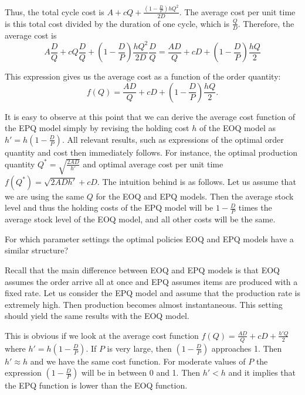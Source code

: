 \begin{solution}
Thus, the total cycle cost is $A+cQ+\frac{(1-\frac{D}{P}) h Q^2}{2D}$. The average cost per unit time is this total cost divided by the duration of one cycle, which is $\frac{Q}{D}$. Therefore, the average cost is
\begin{equation*}
A \frac{D}{Q}+cQ \frac{D}{Q} + \left(1-\frac{D}{P}\right) \frac{h Q^2}{2D} \frac{D}{Q} = \frac{AD}{Q}+cD+\left(1-\frac{D}{P}\right)\frac{hQ}{2}
\end{equation*}

This expression gives us the average cost as a function of the order quantity:
\begin{equation*}
f(Q) = \frac{AD}{Q}+cD+\left(1-\frac{D}{P}\right)\frac{hQ}{2}.
\end{equation*}

It is easy to observe at this point that we can derive the average cost function of the EPQ model simply by revising the holding cost $h$ of the EOQ model as $h'=h \left(1-\frac{D}{P}\right)$. All relevant results, such as expressions of the optimal order quantity and cost then immediately follows. For instance, the optimal production quantity $Q^*=\sqrt{\frac{2AD}{h'}}$ and optimal average cost per unit time $f(Q^*)=\sqrt{2ADh'}+cD$. The intuition behind is as follows. Let us assume that we are using the same $Q$ for the EOQ and EPQ models. Then the average stock level and thus the holding costs of the EPQ model will be $1-\frac{D}{P}$ times the average stock level of the EOQ model, and all other costs will be the same.  
\end{solution}

\begin{question}
For which parameter settings the optimal policies EOQ and EPQ models have a similar structure? 
\end{question}

\begin{solution}
Recall that the main difference between EOQ and EPQ models is that EOQ assumes the order arrive all at once and EPQ assumes items are produced with a fixed rate. Let us consider the EPQ model and assume that the production rate is extremely high. Then production becomes almost instantaneous. This setting should yield the same results with the EOQ model.

This is obvious if we look at the average cost function $f(Q) = \frac{AD}{Q}+cD+\frac{h'Q}{2}$ where $h'=h\left(1-\frac{D}{P}\right)$. If $P$ is very large, then 
$\left(1-\frac{D}{P}\right)$ approaches 1. Then $h'\approx h$ and we have the same cost function. For moderate values of $P$ the expression $\left(1-\frac{D}{P}\right)$ will be in between 0 and 1. Then $h'<h$ and it implies that the EPQ function is lower than the EOQ function.
\end{solution}

